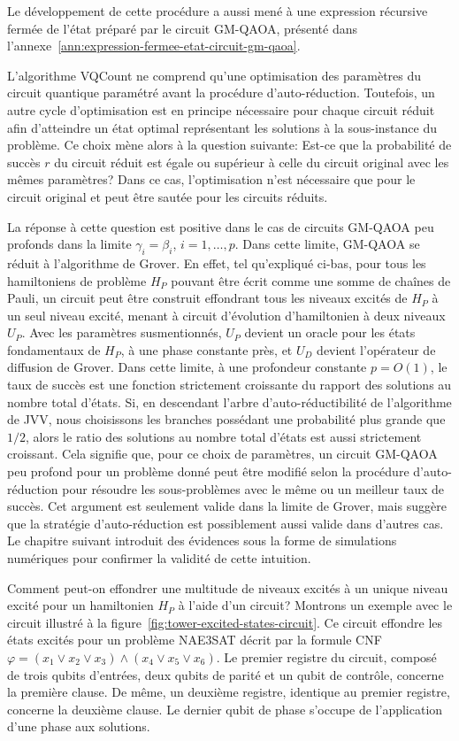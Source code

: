 Le développement de cette procédure a aussi mené à une expression récursive fermée de l'état préparé par le circuit GM-QAOA, présenté dans l'annexe~\ref{ann:expression-fermee-etat-circuit-gm-qaoa}.

L'algorithme VQCount ne comprend qu'une optimisation des paramètres du circuit quantique paramétré avant la procédure d'auto-réduction. Toutefois, un autre cycle d'optimisation est en principe nécessaire pour chaque circuit réduit afin d'atteindre un état optimal représentant les solutions à la sous-instance du problème. Ce choix mène alors à la question suivante: Est-ce que la probabilité de succès $r$ du circuit réduit est égale ou supérieur à celle du circuit original avec les mêmes paramètres? Dans ce cas, l'optimisation n'est nécessaire que pour le circuit original et peut être sautée pour les circuits réduits.

La réponse à cette question est positive dans le cas de circuits GM-QAOA peu profonds dans la limite $\gamma_{i}=\beta_{i}$, $i=1,\dots,p$. Dans cette limite, GM-QAOA se réduit à l'algorithme de Grover. En effet, tel qu'expliqué ci-bas, pour tous les hamiltoniens de problème $H_{P}$ pouvant être écrit comme une somme de chaînes de Pauli, un circuit peut être construit effondrant tous les niveaux excités de $H_{P}$ à un seul niveau excité, menant à circuit d'évolution d'hamiltonien à deux niveaux $U_{P}$. Avec les paramètres susmentionnés, $U_{P}$ devient un oracle pour les états fondamentaux de $H_{P}$, à une phase constante près, et $U_{D}$ devient l'opérateur de diffusion de Grover. Dans cette limite, à une profondeur constante $p=O(1)$, le taux de succès est une fonction strictement croissante du rapport des solutions au nombre total d'états. Si, en descendant l'arbre d'auto-réductibilité de l'algorithme de JVV, nous choisissons les branches possédant une probabilité plus grande que $1/2$, alors le ratio des solutions au nombre total d'états est aussi strictement croissant. Cela signifie que, pour ce choix de paramètres, un circuit GM-QAOA peu profond pour un problème donné peut être modifié selon la procédure d'auto-réduction pour résoudre les sous-problèmes avec le même ou un meilleur taux de succès. Cet argument est seulement valide dans la limite de Grover, mais suggère que la stratégie d'auto-réduction est possiblement aussi valide dans d'autres cas. Le chapitre suivant introduit des évidences sous la forme de simulations numériques pour confirmer la validité de cette intuition.

Comment peut-on effondrer une multitude de niveaux excités à un unique niveau excité pour un hamiltonien $H_{P}$ à l'aide d'un circuit? Montrons un exemple avec le circuit illustré à la figure~\ref{fig:tower-excited-states-circuit}. Ce circuit effondre les états excités pour un problème NAE3SAT décrit par la formule CNF $\varphi = (x_{1} \lor x_{2} \lor x_{3}) \land (x_{4} \lor x_{5} \lor x_{6})$. Le premier registre du circuit, composé de trois qubits d'entrées, deux qubits de parité et un qubit de contrôle, concerne la première clause. De même, un deuxième registre, identique au premier registre, concerne la deuxième clause. Le dernier qubit de phase s'occupe de l'application d'une phase aux solutions.

